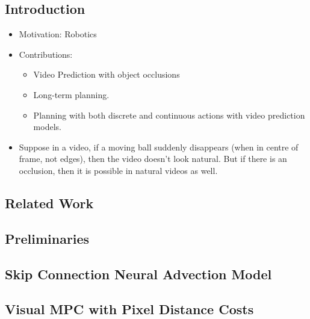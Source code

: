 \documentclass{article}
\begin{document}
    \subsection{Introduction}\label{subsec:Self_Supervised_Visual_Planning_with_Temporal_Skip_Connections:introduction}
    \begin{itemize}
        \item Motivation: Robotics
        \item Contributions:
        \begin{itemize}
            \item Video Prediction with object occlusions
            \item Long-term planning.
            \item Planning with both discrete and continuous actions with video prediction models.
        \end{itemize}
        \item Suppose in a video, if a moving ball suddenly disappears (when in centre of frame, not edges), then the video doesn't look natural.
        But if there is an occlusion, then it is possible in natural videos as well.
    \end{itemize}

    \subsection{Related Work}\label{subsec:Self_Supervised_Visual_Planning_with_Temporal_Skip_Connections:related-work}

    \subsection{Preliminaries}\label{subsec:Self_Supervised_Visual_Planning_with_Temporal_Skip_Connections:preliminaries}

    \subsection{Skip Connection Neural Advection Model}\label{subsec:Self_Supervised_Visual_Planning_with_Temporal_Skip_Connections:skip-connection-neural-advection-model}

    \subsection{Visual MPC with Pixel Distance Costs}\label{subsec:Self_Supervised_Visual_Planning_with_Temporal_Skip_Connections:visual-mpc-with-pixel-distance-costs}
\end{document}
